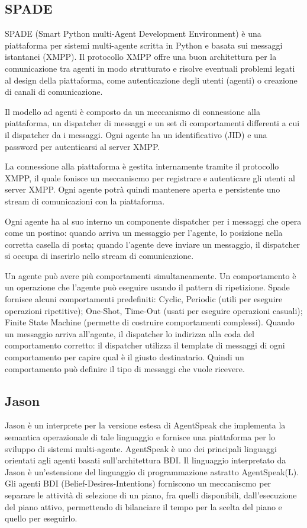 \subsection{SPADE}
SPADE (Smart Python multi-Agent Development Environment) \`e una piattaforma per sistemi multi-agente scritta in Python e basata sui messaggi istantanei (XMPP).
Il protocollo XMPP offre una buon architettura per la comunicazione tra agenti in modo strutturato e risolve eventuali problemi legati al design della piattaforma, come autenticazione degli utenti (agenti) o creazione di canali di comunicazione.

Il modello ad agenti \`e composto da un meccanismo di connessione alla piattaforma, un dispatcher di messaggi e un set di comportamenti differenti a cui il dispatcher da i messaggi. Ogni agente ha un identificativo (JID) e una password per autenticarsi al server XMPP.

La connessione alla piattaforma \`e gestita internamente tramite il protocollo XMPP, il quale fonisce un meccaniscmo per registrare e autenticare gli utenti al server XMPP. Ogni agente potr\`a quindi mantenere aperta e persistente uno stream di comunicazioni con la piattaforma.

Ogni agente ha al suo interno un componente dispatcher per i messaggi che opera come un postino: quando arriva un messaggio per l'agente, lo posizione nella corretta casella di posta; quando l'agente deve inviare un messaggio, il dispatcher si occupa di inserirlo nello stream di comunicazione.

Un agente pu\`o avere pi\`u comportamenti simultaneamente. Un comportamento \`e un operazione che l'agente pu\`o eseguire usando il pattern di ripetizione. Spade fornisce alcuni comportamenti predefiniti: Cyclic, Periodic (utili per eseguire operazioni ripetitive); One-Shot, Time-Out (usati per eseguire operazioni casuali); Finite State Machine (permette di costruire comportamenti complessi).
Quando un messaggio arriva all'agente, il dispatcher lo indirizza alla coda del comportamento corretto: il dispatcher utilizza il template di messaggi di ogni comportamento per capire qual \`e il giusto destinatario. Quindi un comportamento pu\`o definire il tipo di messaggi che vuole ricevere.

\subsection{Jason}
Jason \`e un interprete per la versione estesa di AgentSpeak che implementa la semantica operazionale di tale linguaggio e fornisce una piattaforma per lo sviluppo di sistemi multi-agente. AgentSpeak \`e uno dei principali linguaggi orientati agli agenti basati sull'architettura BDI. Il linguaggio interpretato da Jason \`e un'estensione del linguaggio di programmazione astratto AgentSpeak(L).
Gli agenti BDI (Belief-Desires-Intentions) forniscono un meccaniscmo per separare le attivit\`a di selezione di un piano, fra quelli disponibili, dall'esecuzione del piano attivo, permettendo di bilanciare il tempo per la scelta del piano e quello per eseguirlo.


